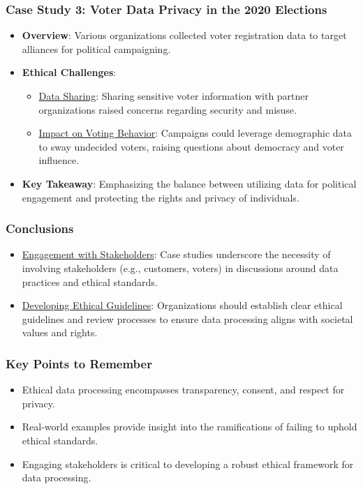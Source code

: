 \documentclass{beamer}
\begin{document}
\begin{frame}[fragile]
    \frametitle{Case Study 3: Voter Data Privacy in the 2020 Elections}
    \begin{itemize}
        \item \textbf{Overview}: Various organizations collected voter registration data to target alliances for political campaigning.
        \item \textbf{Ethical Challenges}:
        \begin{itemize}
            \item \underline{Data Sharing}: Sharing sensitive voter information with partner organizations raised concerns regarding security and misuse.
            \item \underline{Impact on Voting Behavior}: Campaigns could leverage demographic data to sway undecided voters, raising questions about democracy and voter influence.
        \end{itemize}
        \item \textbf{Key Takeaway}: Emphasizing the balance between utilizing data for political engagement and protecting the rights and privacy of individuals.
    \end{itemize}
\end{frame}

\begin{frame}[fragile]
    \frametitle{Conclusions}
    \begin{itemize}
        \item \underline{Engagement with Stakeholders}: Case studies underscore the necessity of involving stakeholders (e.g., customers, voters) in discussions around data practices and ethical standards.
        \item \underline{Developing Ethical Guidelines}: Organizations should establish clear ethical guidelines and review processes to ensure data processing aligns with societal values and rights.
    \end{itemize}
\end{frame}

\begin{frame}[fragile]
    \frametitle{Key Points to Remember}
    \begin{itemize}
        \item Ethical data processing encompasses transparency, consent, and respect for privacy.
        \item Real-world examples provide insight into the ramifications of failing to uphold ethical standards.
        \item Engaging stakeholders is critical to developing a robust ethical framework for data processing.
    \end{itemize}
\end{frame}
\end{document}
